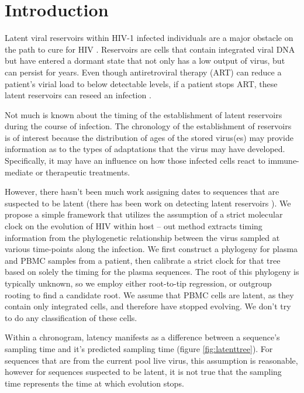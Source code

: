 \section{Introduction} \label{sec:intro}
Latent viral reservoirs within HIV-1 infected individuals are a major obstacle on the path to cure for HIV \citep{Pace11}. Reservoirs are cells that contain integrated viral DNA but have entered a dormant state that not only has a low output of virus, but can persist for years. Even though antiretroviral therapy (ART) can reduce a patient's virial load to below detectable levels, if a patient stops ART, these latent reservoirs can reseed an infection \citep{Joos08, Pomerantz03, Richman09}.

Not much is known about the timing of the establishment of latent reservoirs during the course of infection. The chronology of the establishment of reservoirs is of interest because the distribution of ages of the stored virus(es) may provide information as to the types of adaptations that the virus may have developed. Specifically, it may have an influence on how those infected cells react to immune-mediate or therapeutic treatments. 

However, there hasn't been much work assigning dates to sequences that are suspected to be latent (there has been work on detecting latent reservoirs \cite{Immonen14}). We propose a simple framework that utilizes the assumption of a strict molecular clock on the evolution of HIV within host -- out method extracts timing information from the phylogenetic relationship between the virus sampled at various time-points along the infection. We first construct a phylogeny for plasma and PBMC samples from a patient, then calibrate a strict clock for that tree based on solely the timing for the plasma sequences. The root of this phylogeny is typically unknown, so we employ either root-to-tip regression, or outgroup rooting to find a candidate root. We assume that PBMC cells are latent, as they contain only integrated cells, and therefore have stopped evolving. We don't try to do any classification of these cells.

Within a chronogram, latency manifests as a difference between a sequence's sampling time and it's predicted sampling time (figure \ref{fig:latenttree}). For sequences that are from the current pool live virus, this assumption is reasonable, however for sequences suspected to be latent, it is not true that the sampling time represents the time at which evolution stops.


